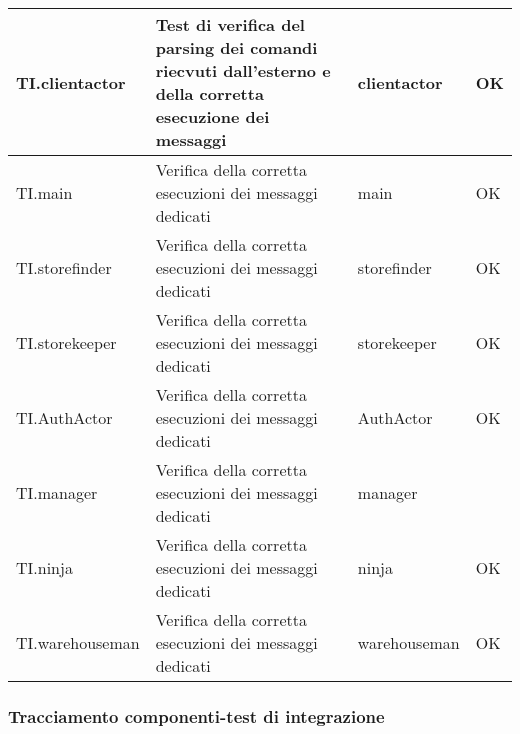 \documentclass{scalatekids-article}
\begin{document}
\begin{longtable}[H]{| l | p{10cm} | l | l |}
  \hline
  TI.clientactor & Test di verifica del parsing dei comandi riecvuti dall'esterno e della corretta esecuzione dei messaggi & clientactor & OK\\
  \hline
  TI.main & Verifica della corretta esecuzioni dei messaggi dedicati & main & OK\\
  \hline
  TI.storefinder & Verifica della corretta esecuzioni dei messaggi dedicati & storefinder & OK\\
  \hline
  TI.storekeeper & Verifica della corretta esecuzioni dei messaggi dedicati & storekeeper & OK\\
  \hline
  TI.AuthActor & Verifica della corretta esecuzioni dei messaggi dedicati & AuthActor & OK\\
  \hline
  TI.manager & Verifica della corretta esecuzioni dei messaggi dedicati & manager &\\
  \hline
  TI.ninja & Verifica della corretta esecuzioni dei messaggi dedicati & ninja & OK\\
  \hline
  TI.warehouseman & Verifica della corretta esecuzioni dei messaggi dedicati & warehouseman & OK\\
  \hline
\end{longtable}

\subsubsection{Tracciamento componenti-test di integrazione}
\end{document}
